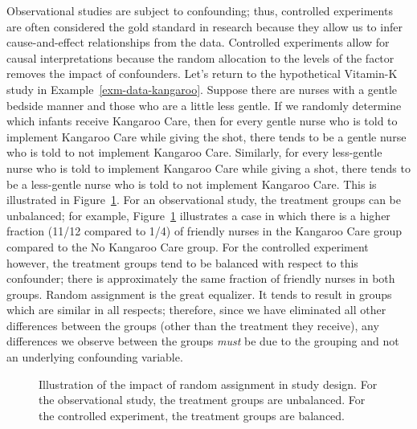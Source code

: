 \documentclass[
  letterpaper,
  DIV=11,
  numbers=noendperiod]{scrreprt}
\theoremstyle{definition}
\theoremstyle{definition}
\theoremstyle{plain}
\theoremstyle{remark}
\begin{document}
Observational studies are subject to confounding; thus, controlled
experiments are often considered the gold standard in research because
they allow us to infer cause-and-effect relationships from the data.
Controlled experiments allow for causal interpretations because the
random allocation to the levels of the factor removes the impact of
confounders. Let's return to the hypothetical Vitamin-K study in
Example~\ref{exm-data-kangaroo}. Suppose there are nurses with a gentle
bedside manner and those who are a little less gentle. If we randomly
determine which infants receive Kangaroo Care, then for every gentle
nurse who is told to implement Kangaroo Care while giving the shot,
there tends to be a gentle nurse who is told to not implement Kangaroo
Care. Similarly, for every less-gentle nurse who is told to implement
Kangaroo Care while giving a shot, there tends to be a less-gentle nurse
who is told to not implement Kangaroo Care. This is illustrated in
Figure~\ref{fig-data-randomization}. For an observational study, the
treatment groups can be unbalanced; for example,
Figure~\ref{fig-data-randomization} illustrates a case in which there is
a higher fraction (11/12 compared to 1/4) of friendly nurses in the
Kangaroo Care group compared to the No Kangaroo Care group. For the
controlled experiment however, the treatment groups tend to be balanced
with respect to this confounder; there is approximately the same
fraction of friendly nurses in both groups. Random assignment is the
great equalizer. It tends to result in groups which are similar in all
respects; therefore, since we have eliminated all other differences
between the groups (other than the treatment they receive), any
differences we observe between the groups \emph{must} be due to the
grouping and not an underlying confounding variable.

\begin{figure}


\caption{\label{fig-data-randomization}Illustration of the impact of
random assignment in study design. For the observational study, the
treatment groups are unbalanced. For the controlled experiment, the
treatment groups are balanced.}

\end{figure}%
\end{document}
